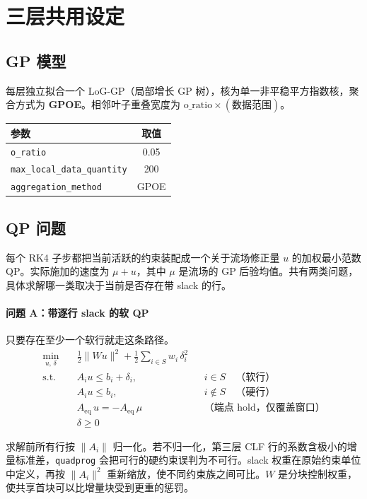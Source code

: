 \documentclass[11pt,a4paper]{ctexart}
\newcommand{\cf}[1]{\texttt{\small #1}}
\begin{document}
\section{三层共用设定}

\subsection{GP 模型}
每层独立拟合一个 LoG-GP（局部增长 GP 树），核为单一非平稳平方指数核，聚合方式为 \textbf{GPOE}。相邻叶子重叠宽度为 $\text{o\_ratio}\times(\text{数据范围})$。

\begin{center}
\small
\begin{tabular}{@{}lc@{}}
\toprule
\textbf{参数} & \textbf{取值} \\
\midrule
\cf{o\_ratio} & 0.05 \\
\cf{max\_local\_data\_quantity} & 200 \\
\cf{aggregation\_method} & GPOE \\
\bottomrule
\end{tabular}
\end{center}

\subsection{QP 问题}
每个 RK4 子步都把当前活跃的约束装配成一个关于流场修正量 $u$ 的加权最小范数 QP。实际施加的速度为 $\mu+u$，其中 $\mu$ 是流场的 GP 后验均值。共有两类问题，具体求解哪一类取决于当前是否存在带 slack 的行。

\paragraph{问题 A：带逐行 slack 的软 QP}
只要存在至少一个软行就走这条路径。
\begin{align*}
\min_{u,\,\delta}\quad & \tfrac12\lVert W u\rVert^2+\tfrac12\sum_{i\in S} w_i\,\delta_i^{2}\\
\text{s.t.}\quad
& A_i u \le b_i+\delta_i, && i\in S \quad\text{（软行）}\\
& A_i u \le b_i, && i\notin S \quad\text{（硬行）}\\
& A_{\mathrm{eq}}\,u = -A_{\mathrm{eq}}\,\mu && \text{（端点 hold，仅覆盖窗口）}\\
& \delta \ge 0
\end{align*}

\noindent 求解前所有行按 $\lVert A_i\rVert$ 归一化。若不归一化，第三层 CLF 行的系数含极小的增量标准差，\cf{quadprog} 会把可行的硬约束误判为不可行。slack 权重在原始约束单位中定义，再按 $\lVert A_i\rVert^{2}$ 重新缩放，使不同约束族之间可比。$W$ 是分块控制权重，使共享首块可以比增量块受到更重的惩罚。
\end{document}
